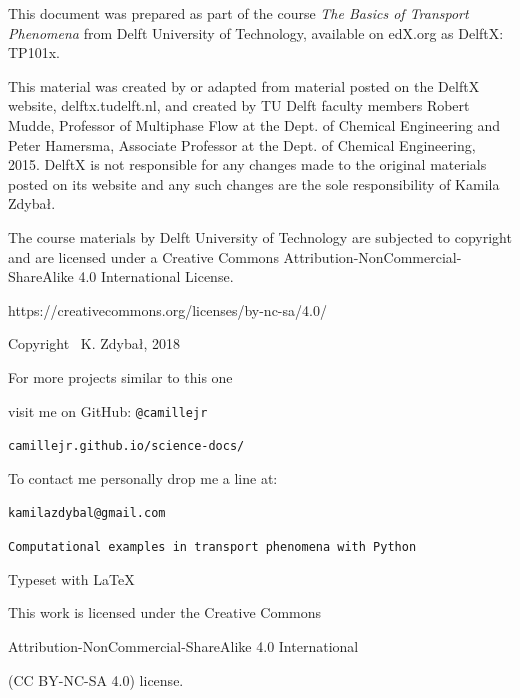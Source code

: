 \documentclass[10pt]{article}
\begin{document}
\thispagestyle{empty}
\begin{center}

This document was prepared as part of the course \textit{The Basics of Transport Phenomena} from Delft University of Technology, available on edX.org as DelftX: TP101x.

This material was created by or adapted from material posted on the DelftX website, delftx.tudelft.nl, and created by TU Delft faculty members Robert Mudde, Professor of Multiphase Flow at the Dept. of Chemical Engineering and Peter Hamersma, Associate Professor at the Dept. of Chemical Engineering, 2015. DelftX is not responsible for any changes made to the original materials posted on its website and any such changes are the sole responsibility of Kamila Zdybał.

The course materials by Delft University of Technology are subjected to copyright and are licensed under a Creative Commons Attribution-NonCommercial-ShareAlike 4.0 International License.

https://creativecommons.org/licenses/by-nc-sa/4.0/

\vspace*{7cm}

\setlength{\parskip}{0.0em}
\setlength{\parindent}{0cm}

Copyright \textcopyright \, K. Zdybał, 2018

For more projects similar to this one

visit me on GitHub: \verb|@camillejr|

\verb|camillejr.github.io/science-docs/|

To contact me personally drop me a line at:

\verb|kamilazdybal@gmail.com|

\vspace*{2cm}

\verb|Computational examples in transport phenomena with Python|

Typeset with \LaTeX

\vspace*{1.8cm}

\noindent This work is licensed under the Creative Commons

Attribution-NonCommercial-ShareAlike 4.0 International 

(CC BY-NC-SA
4.0) license.
\end{center}

\setlength{\parskip}{0.6em}
\setlength{\parindent}{0cm}
\end{document}
